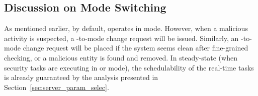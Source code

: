 \documentclass[../rt_server_main.tex]{subfiles}
\begin{document}




\subsection{Discussion on Mode Switching} \label{subsec:mode_switch_diss}


As mentioned earlier, by default, \coolname operates in \pve mode. However, when a malicious activity is suspected, a \pve-to-\ave mode change request will be issued. Similarly,  an \ave-to-\pve mode change request will be placed if the system seems clean after fine-grained checking, or a malicious entity is found and removed. %
 In steady-state (\eg when security tasks are executing in \pve or \ave mode), the schedulability of the real-time tasks is already guaranteed by the analysis presented in Section~\ref{sec:server_param_selec}. %
 
\end{document}
